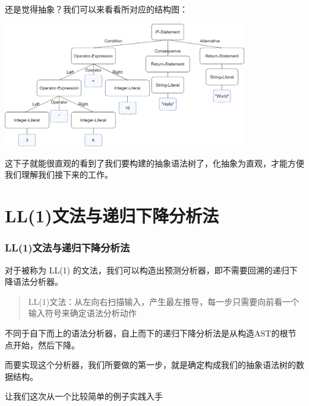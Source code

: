 \documentclass{beamer}
\begin{document}
	\begin{frame}
		还是觉得抽象？我们可以来看看所对应的结构图：
		
		\includegraphics[width=0.8\textwidth]{pics/抽象语法树}
		
		这下子就能很直观的看到了我们要构建的抽象语法树了，化抽象为直观，才能方便我们理解我们接下来的工作。
	\end{frame}
	\section{LL(1)文法与递归下降分析法}
	
	\begin{frame}
		\frametitle{LL(1)文法与递归下降分析法}
		对于被称为 LL(1) 的文法，我们可以构造出预测分析器，即不需要回溯的递归下降语法分析器。
		
		\begin{quote}
			LL(1)文法：从左向右扫描输入，产生最左推导，每一步只需要向前看一个输入符号来确定语法分析动作
		\end{quote}
		
		
		不同于自下而上的语法分析器，自上而下的递归下降分析法是从构造AST的根节点开始，然后下降。
		
		而要实现这个分析器，我们所要做的第一步，就是确定构成我们的抽象语法树的数据结构。
		
		让我们这次从一个比较简单的例子实践入手
	\end{frame}
	
\end{document}
